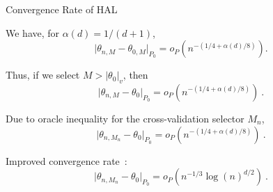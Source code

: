 \documentclass{beamer}
\begin{document}
\begin{frame}{Convergence Rate of HAL}
\vspace{0.25cm}

We have, for $\alpha(d)=1/(d+1)$,
\[
  \lvert \theta_{n,M} - \theta_{0,M} \rvert_{P_0}=o_P(n^{-(1/4+\alpha(d)/8)}).
\]

Thus, if we select $M> \lvert \theta_0 \rvert_v$, then
\[
  \lvert \theta_{n,M} - \theta_{0} \rvert_{P_0} =
  o_P(n^{-(1/4+\alpha(d)/8)})\ .
\]

Due to oracle inequality for the cross-validation selector $M_n$,
\[
  \lvert \theta_{n,M_n} - \theta_{0} \rvert_{P_0} =
  o_P(n^{-(1/4+\alpha(d)/8)}) \ .
\]

Improved convergence rate~\citep{bibaut2019fast}:
\[
  \lvert \theta_{n,M_n} - \theta_{0} \rvert_{P_0} =
  o_P(n^{-1/3} \log(n)^{d/2}) \ .
\]


\end{frame}



\end{document}
